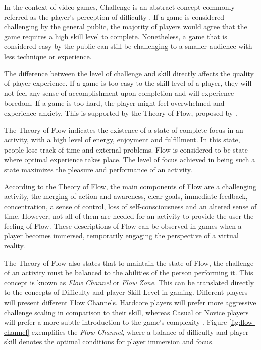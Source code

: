In the context of video games, Challenge is an abstract concept commonly referred as the player's perception of difficulty \cite{ARTICLE_RoleOfChallenge}. If a game is considered challenging by the general public, the majority of players would agree that the game requires a high skill level to complete. Nonetheless, a game that is considered easy by the public can still be challenging to a smaller audience with less technique or experience.

The difference between the level of challenge and skill directly affects the quality of player experience. If a game is too easy to the skill level of a player, they will not feel any sense of accomplishment upon completion and will experience boredom. If a game is too hard, the player might feel overwhelmed and experience anxiety. This is supported by the Theory of Flow, proposed by \cite{BOOK_Flow}.

The Theory of Flow indicates the existence of a state of complete focus in an activity, with a high level of energy, enjoyment and fulfillment. In this state, people lose track of time and external problems. Flow is considered to be state where optimal experience takes place. The level of focus achieved in being such a state maximizes the pleasure and performance of an activity.

According to the Theory of Flow, the main components of Flow are a challenging activity, the merging of action and awareness, clear goals, immediate feedback, concentration, a sense of control, loss of self-consciousness and an altered sense of time. However, not all of them are needed for an activity to provide the user the feeling of Flow. These descriptions of Flow can be observed in games when a player becomes immersed, temporarily engaging the perspective of a virtual reality.

The Theory of Flow also states that to maintain the state of Flow, the challenge of an activity must be balanced to the abilities of the person performing it. This concept is known as \emph{Flow Channel} or \emph{Flow Zone}. This can be translated directly to the concepts of Difficulty and player Skill Level in gaming. Different players will present different Flow Channels. Hardcore players will prefer more aggressive challenge scaling in comparison to their skill, whereas Casual or Novice players will prefer a more subtle introduction to the game's complexity \cite{ARTICLE_FlowInGames}. Figure \ref{fig:flow-channel} exemplifies the \emph{Flow Channel}, where a balance of difficulty and player skill denotes the optimal conditions for player immersion and focus.

